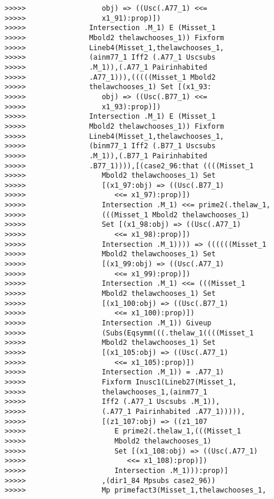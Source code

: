 \documentclass[12pt]{article}
\begin{document}
\begin{verbatim}
>>>>>                  obj) => ((Usc(.A77_1) <<=
>>>>>                  x1_91):prop)])
>>>>>               Intersection .M_1) E (Misset_1
>>>>>               Mbold2 thelawchooses_1)) Fixform
>>>>>               Lineb4(Misset_1,thelawchooses_1,
>>>>>               (ainm77_1 Iff2 (.A77_1 Uscsubs
>>>>>               .M_1)),(.A77_1 Pairinhabited
>>>>>               .A77_1))),(((((Misset_1 Mbold2
>>>>>               thelawchooses_1) Set [(x1_93:
>>>>>                  obj) => ((Usc(.B77_1) <<=
>>>>>                  x1_93):prop)])
>>>>>               Intersection .M_1) E (Misset_1
>>>>>               Mbold2 thelawchooses_1)) Fixform
>>>>>               Lineb4(Misset_1,thelawchooses_1,
>>>>>               (binm77_1 Iff2 (.B77_1 Uscsubs
>>>>>               .M_1)),(.B77_1 Pairinhabited
>>>>>               .B77_1)))),[(case2_96:that ((((Misset_1
>>>>>                  Mbold2 thelawchooses_1) Set
>>>>>                  [(x1_97:obj) => ((Usc(.B77_1)
>>>>>                     <<= x1_97):prop)])
>>>>>                  Intersection .M_1) <<= prime2(.thelaw_1,
>>>>>                  (((Misset_1 Mbold2 thelawchooses_1)
>>>>>                  Set [(x1_98:obj) => ((Usc(.A77_1)
>>>>>                     <<= x1_98):prop)])
>>>>>                  Intersection .M_1)))) => ((((((Misset_1
>>>>>                  Mbold2 thelawchooses_1) Set
>>>>>                  [(x1_99:obj) => ((Usc(.A77_1)
>>>>>                     <<= x1_99):prop)])
>>>>>                  Intersection .M_1) <<= (((Misset_1
>>>>>                  Mbold2 thelawchooses_1) Set
>>>>>                  [(x1_100:obj) => ((Usc(.B77_1)
>>>>>                     <<= x1_100):prop)])
>>>>>                  Intersection .M_1)) Giveup
>>>>>                  (Subs(Eqsymm(((.thelaw_1((((Misset_1
>>>>>                  Mbold2 thelawchooses_1) Set
>>>>>                  [(x1_105:obj) => ((Usc(.A77_1)
>>>>>                     <<= x1_105):prop)])
>>>>>                  Intersection .M_1)) = .A77_1)
>>>>>                  Fixform Inusc1(Lineb27(Misset_1,
>>>>>                  thelawchooses_1,(ainm77_1
>>>>>                  Iff2 (.A77_1 Uscsubs .M_1)),
>>>>>                  (.A77_1 Pairinhabited .A77_1))))),
>>>>>                  [(z1_107:obj) => ((z1_107
>>>>>                     E prime2(.thelaw_1,(((Misset_1
>>>>>                     Mbold2 thelawchooses_1)
>>>>>                     Set [(x1_108:obj) => ((Usc(.A77_1)
>>>>>                        <<= x1_108):prop)])
>>>>>                     Intersection .M_1))):prop)]
>>>>>                  ,(dir1_84 Mpsubs case2_96))
>>>>>                  Mp primefact3(Misset_1,thelawchooses_1,

\end{verbatim}
\end{document}
